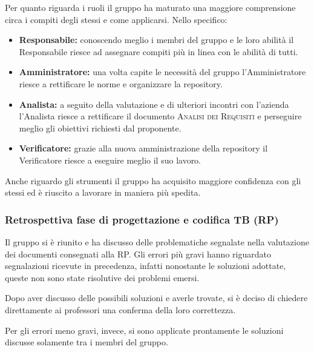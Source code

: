 Per quanto riguarda i ruoli il gruppo ha maturato una maggiore comprensione circa i compiti degli stessi e come applicarsi. Nello specifico:
\begin{itemize}
	\item \textbf{Responsabile:} conoscendo meglio i membri del gruppo e le loro abilità il Responsabile riesce ad assegnare compiti più in linea con le abilità di tutti.
	\item \textbf{Amministratore:} una volta capite le necessità del gruppo l'Amministratore riesce a rettificare le norme e organizzare la repository.
	\item \textbf{Analista:} a seguito della valutazione e di ulteriori incontri con l'azienda l'Analista riesce a rettificare il documento \textsc{Analisi dei Requisiti} e perseguire meglio gli obiettivi richiesti dal proponente.
	\item \textbf{Verificatore:} grazie alla nuova amministrazione della repository il Verificatore riesce a eseguire meglio il suo lavoro.
\end{itemize}

Anche riguardo gli strumenti il gruppo ha acquisito maggiore confidenza con gli stessi ed è riuscito a lavorare in maniera più spedita.

\subsubsection{Retrospettiva fase di progettazione e codifica TB (RP)}
\label{par:retrospettiva-RP}

Il gruppo si è riunito e ha discusso delle problematiche segnalate nella valutazione dei documenti consegnati alla RP.
Gli errori più gravi hanno riguardato segnalazioni ricevute in precedenza, infatti nonostante le soluzioni adottate, queste non sono state risolutive dei problemi emersi.

Dopo aver discusso delle possibili soluzioni e averle trovate, si è deciso di chiedere direttamente ai professori una conferma della loro correttezza.

Per gli errori meno gravi, invece, si sono applicate prontamente le soluzioni discusse solamente tra i membri del gruppo.

